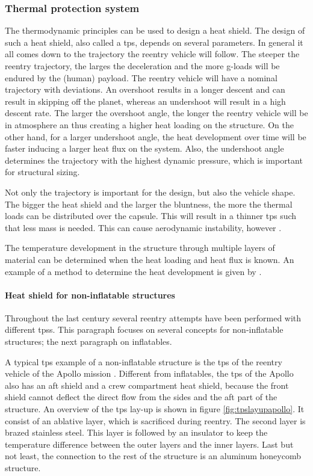 \subsubsection{Thermal protection system}
The thermodynamic principles can be used to design a heat shield. The design of such a heat shield, also called a \acrfull{tps}, depends on several parameters. In general it all comes down to the trajectory the reentry vehicle will follow. The steeper the reentry trajectory, the larges the deceleration and the more g-loads will be endured by the (human) payload. The reentry vehicle will have a nominal trajectory with deviations. An overshoot results in a longer descent and can result in skipping off the planet, whereas an undershoot will result in a high descent rate. The larger the overshoot angle, the longer the reentry vehicle will be in atmosphere an thus creating a higher heat loading on the structure. On the other hand, for a larger undershoot angle, the heat development over time will be faster inducing a larger heat flux on the system. Also, the undershoot angle determines the trajectory with the highest dynamic pressure, which is important for structural sizing. 

Not only the trajectory is important for the design, but also the vehicle shape. The bigger the heat shield and the larger the bluntness, the more the thermal loads can be distributed over the capsule. This will result in a thinner \gls{tps} such that less mass is needed. This can cause aerodynamic instability, however \cite{Smoot}.

The temperature development in the structure through multiple layers of material can be determined when the heat loading and heat flux is known. An example of a method to determine the heat development is given by \cite{Hollis}.

\paragraph{Heat shield for non-inflatable structures}

Throughout the last century several reentry attempts have been performed with different \gls{tps}s. This paragraph focuses on several concepts for non-inflatable structures; the next paragraph on inflatables. 

A typical \gls{tps} example of a non-inflatable structure is the \gls{tps} of the reentry vehicle of the Apollo mission \cite{Pavlosky1974}. Different from inflatables, the \gls{tps} of the Apollo also has an aft shield and a crew compartment heat shield, because the front shield cannot deflect the direct flow from the sides and the aft part of the structure. An overview of the \gls{tps} lay-up is shown in figure \ref{fig:tpslayupapollo}. It consist of an ablative layer, which is sacrificed during reentry. The second layer is brazed stainless steel. This layer is followed by an insulator to keep the temperature difference between the outer layers and the inner layers. Last but not least, the connection to the rest of the structure is an aluminum honeycomb structure.

